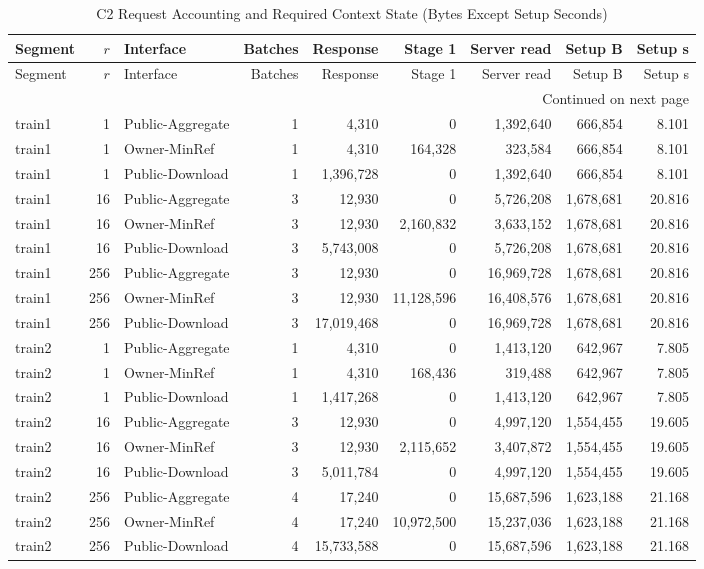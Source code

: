 \begingroup\small\setlength{\tabcolsep}{5pt}
\begin{longtable}{@{}lrlrrrrrr@{}}
\caption{C2 Request Accounting and Required Context State (Bytes Except Setup Seconds)}\label{tab:c2-accounting}\\
\toprule Segment & $r$ & Interface & Batches & Response & Stage 1 & Server read & Setup B & Setup s\\\midrule\endfirsthead
\toprule Segment & $r$ & Interface & Batches & Response & Stage 1 & Server read & Setup B & Setup s\\\midrule\endhead
\midrule\multicolumn{9}{r}{Continued on next page}\\\endfoot
\bottomrule\endlastfoot
train1 & 1 & Public-Aggregate & 1 & 4,310 & 0 & 1,392,640 & 666,854 & 8.101\\
train1 & 1 & Owner-MinRef & 1 & 4,310 & 164,328 & 323,584 & 666,854 & 8.101\\
train1 & 1 & Public-Download & 1 & 1,396,728 & 0 & 1,392,640 & 666,854 & 8.101\\
train1 & 16 & Public-Aggregate & 3 & 12,930 & 0 & 5,726,208 & 1,678,681 & 20.816\\
train1 & 16 & Owner-MinRef & 3 & 12,930 & 2,160,832 & 3,633,152 & 1,678,681 & 20.816\\
train1 & 16 & Public-Download & 3 & 5,743,008 & 0 & 5,726,208 & 1,678,681 & 20.816\\
train1 & 256 & Public-Aggregate & 3 & 12,930 & 0 & 16,969,728 & 1,678,681 & 20.816\\
train1 & 256 & Owner-MinRef & 3 & 12,930 & 11,128,596 & 16,408,576 & 1,678,681 & 20.816\\
train1 & 256 & Public-Download & 3 & 17,019,468 & 0 & 16,969,728 & 1,678,681 & 20.816\\
train2 & 1 & Public-Aggregate & 1 & 4,310 & 0 & 1,413,120 & 642,967 & 7.805\\
train2 & 1 & Owner-MinRef & 1 & 4,310 & 168,436 & 319,488 & 642,967 & 7.805\\
train2 & 1 & Public-Download & 1 & 1,417,268 & 0 & 1,413,120 & 642,967 & 7.805\\
train2 & 16 & Public-Aggregate & 3 & 12,930 & 0 & 4,997,120 & 1,554,455 & 19.605\\
train2 & 16 & Owner-MinRef & 3 & 12,930 & 2,115,652 & 3,407,872 & 1,554,455 & 19.605\\
train2 & 16 & Public-Download & 3 & 5,011,784 & 0 & 4,997,120 & 1,554,455 & 19.605\\
train2 & 256 & Public-Aggregate & 4 & 17,240 & 0 & 15,687,596 & 1,623,188 & 21.168\\
train2 & 256 & Owner-MinRef & 4 & 17,240 & 10,972,500 & 15,237,036 & 1,623,188 & 21.168\\
train2 & 256 & Public-Download & 4 & 15,733,588 & 0 & 15,687,596 & 1,623,188 & 21.168\\
\end{longtable}
\endgroup
